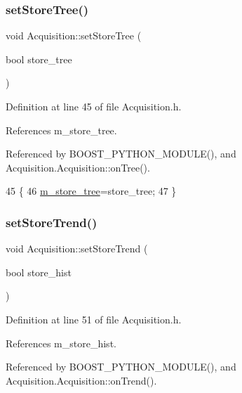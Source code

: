 \subsubsection{\texorpdfstring{set\+Store\+Tree()}{setStoreTree()}}
{\footnotesize\ttfamily void Acquisition\+::set\+Store\+Tree (\begin{DoxyParamCaption}\item[{bool}]{store\+\_\+tree }\end{DoxyParamCaption})\hspace{0.3cm}{\ttfamily [inline]}}



Definition at line 45 of file Acquisition.\+h.



References m\+\_\+store\+\_\+tree.



Referenced by B\+O\+O\+S\+T\+\_\+\+P\+Y\+T\+H\+O\+N\+\_\+\+M\+O\+D\+U\+L\+E(), and Acquisition.\+Acquisition\+::on\+Tree().


\begin{DoxyCode}
45                                     \{
46     \hyperlink{classAcquisition_aca2143e9135e25554e58327475a767c5}{m\_store\_tree}=store\_tree;
47   \}
\end{DoxyCode}
\mbox{\label{classAcquisition_a1ceff272a1ad030dcd20c0dcddc65443}} 
\subsubsection{\texorpdfstring{set\+Store\+Trend()}{setStoreTrend()}}
{\footnotesize\ttfamily void Acquisition\+::set\+Store\+Trend (\begin{DoxyParamCaption}\item[{bool}]{store\+\_\+hist }\end{DoxyParamCaption})\hspace{0.3cm}{\ttfamily [inline]}}



Definition at line 51 of file Acquisition.\+h.



References m\+\_\+store\+\_\+hist.



Referenced by B\+O\+O\+S\+T\+\_\+\+P\+Y\+T\+H\+O\+N\+\_\+\+M\+O\+D\+U\+L\+E(), and Acquisition.\+Acquisition\+::on\+Trend().


